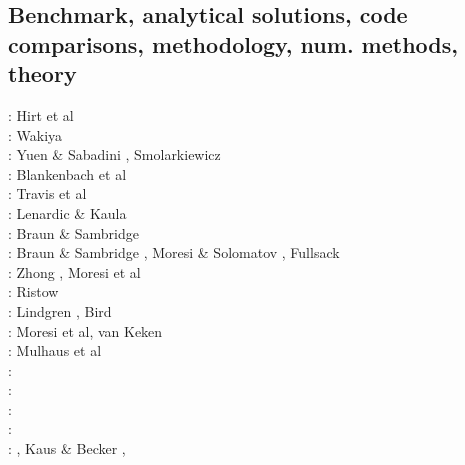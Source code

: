 \subsection{Benchmark, analytical solutions, code comparisons, methodology, num. methods, theory}

\begin{scriptsize}
\nineteenseventyfour: Hirt et al \cite{hiac74}\\
\nineteenseventyfive: Wakiya \cite{waki75a,waki75b}\\
\nineteeneightyfour: Yuen \& Sabadini \cite{yusa84}, Smolarkiewicz \cite{smol84}\\
\nineteeneightynine: Blankenbach et al \cite{blbc89}\\
\nineteenninety: Travis et al \cite{trab90}\\
\nineteenninetythree: Lenardic \& Kaula \cite{leka93}\\
\nineteenninetyfour: Braun \& Sambridge \cite{brsa94}\\
\nineteenninetyfive: Braun \& Sambridge \cite{brsa95}, Moresi \& Solomatov \cite{moso95}, 
                     Fullsack \cite{full95}\\
\nineteenninetysix: Zhong \cite{zhon96}, Moresi et al \cite{mozg96}\\
\nineteenninetyseven: Ristow \cite{rist97}\\
\nineteenninetynine: Lindgren \cite{lind99}, Bird \cite{bird99}\\
\twothousandone: Moresi et al\cite{modm01}, van Keken \cite{vank01}\\
\twothousandtwo: Mulhaus et al \cite{mudm02}\\
\twothousandthree: \cite{taki03}\cite{modm03}\cite{geyu03}\cite{geyu03b}\cite{taxi03}\cite{scpo03}\\
\twothousandfour: \cite{kaps04}\cite{kasa04}\cite{kaks08}\cite{mumc04}\\
\twothousandfive: \cite{mure05}\\
\twothousandsix: \cite{kapo06}\cite{more06}\cite{onmm06}\cite{mudm06}\cite{tact06}\\
\twothousandseven: \cite{toma07}\cite{chcc07}, Kaus \& Becker \cite{kabe07}, \cite{kaks07}\cite{moql07}\cite{geyu07}\cite{dadh07}

\end{scriptsize}
